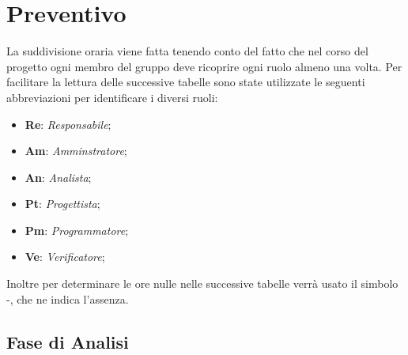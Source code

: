 \section{Preventivo}
La suddivisione oraria viene fatta tenendo conto del fatto che nel corso del progetto ogni  membro del gruppo deve ricoprire ogni ruolo almeno una volta.
Per facilitare la lettura delle successive tabelle sono state utilizzate le seguenti abbreviazioni per identificare i diversi ruoli:
\begin{itemize}
	\item \textbf{Re}: \textit{Responsabile};
	\item \textbf{Am}: \textit{Amminstratore};
	\item \textbf{An}: \textit{Analista};
	\item \textbf{Pt}: \textit{Progettista};
	\item \textbf{Pm}: \textit{Programmatore};
	\item \textbf{Ve}: \textit{Verificatore};
\end{itemize}
Inoltre per determinare le ore nulle nelle successive tabelle verrà usato il simbolo -, che ne indica l'assenza.

\subsection{Fase di Analisi}
